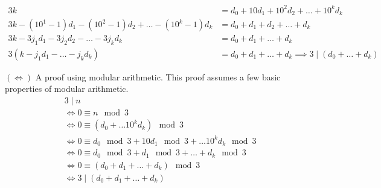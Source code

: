 \documentclass[a4paper]{article}
\begin{document}
\begin{enumerate}
\begin{align*}
3k &= d_0 + 10d_1 + 10^2d_2 + \dots + 10^kd_k \\
3k - (10^1 - 1)d_1  - (10^2 - 1)d_2 + \dots - (10^k-1)d_k
&= d_0 + d_1 + d_2 + \dots + d_k \\
3k - 3j_1d_1 - 3j_2d_2 - \dots - 3j_kd_k &= d_0 + d_1 + \dots + d_k \\
3(k - j_1d_1 - \dots - j_kd_k) &= d_0 + d_1 + \dots + d_k \implies 3 \mid (d_0 + \dots + d_k)
\end{align*}


$(\iff)$ A proof using modular arithmetic. This proof assumes a few basic properties of modular arithmetic. 
\begin{align*}
&3 \mid n \\
&\iff 0 \equiv n \mod 3 \\
&\iff 0 \equiv (d_0 + \dots 10^kd_k) \mod 3 \\
&\iff 0 \equiv d_0 \mod 3 + 10d_1 \mod 3 + \dots 10^kd_k \mod 3\\
&\iff 0 \equiv d_0 \mod 3 + d_1 \mod 3 + \dots + d_k \mod 3 \\
&\iff 0 \equiv (d_0 + d_1 + \dots + d_k) \mod 3 \\
&\iff 3 \mid (d_0 + d_1 + \dots + d_k)
\end{align*}

\end{enumerate}
\end{document}
